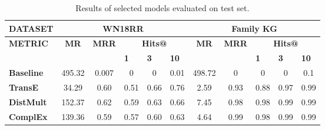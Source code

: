 \begin{table}[h]
\centering
\begin{tabular}{|l||ccccc||ccccc|}
\hline
{\textbf{DATASET}}                 & \multicolumn{5}{c||}{\textbf{WN18RR}}                                                                                                                                               & \multicolumn{5}{c|}{\textbf{Family KG}}                                                                                                                            \\ \hline
\multirow{2}{*}{{\textbf{METRIC}}} & \multicolumn{1}{c|}{\multirow{2}{*}{\textbf{MR}}} & \multicolumn{1}{c|}{\multirow{2}{*}{\textbf{MRR}}} & \multicolumn{3}{c||}{\textbf{Hits@}}                                       & \multicolumn{1}{c|}{\multirow{2}{*}{\textbf{MR}}} & \multicolumn{1}{c|}{\multirow{2}{*}{\textbf{MRR}}} & \multicolumn{3}{c|}{\textbf{Hits@}}                                       \\ \cline{4-6} \cline{9-11} 
                                       & \multicolumn{1}{c|}{}                             & \multicolumn{1}{c|}{}                              & \multicolumn{1}{l|}{\textbf{1}} & \multicolumn{1}{l|}{\textbf{3}} & \multicolumn{1}{l||}{\textbf{10}} & \multicolumn{1}{c|}{}                             & \multicolumn{1}{c|}{}                              & \multicolumn{1}{l|}{\textbf{1}} & \multicolumn{1}{l|}{\textbf{3}} & \multicolumn{1}{l|}{\textbf{10}} \\ \hline
\textbf{Baseline}       & 495.32     & 0.007      & 0     & 0       & 0.01        & 498.72       & 0     & 0       & 0       & 0.1      \\ 
\textbf{TransE}  & 34.29  & 0.60       & 0.51                     & 0.66    & 0.76 & 2.59     & 0.93  &0.88  & 0.97   & 0.99   \\ 
\textbf{DistMult}      & 152.37  & 0.62    & 0.59   & 0.63      & 0.66   & 7.45    & 0.98     & 0.98    & 0.99   & 0.99    \\ 
\textbf{ComplEx}        & 139.36    & 0.59      & 0.57      & 0.60      & 0.63      & 4.64     & 0.99     & 0.98     & 0.99      & 0.99  \\ \hline
\end{tabular}
\caption{Results of selected models evaluated on test set.}
\end{table}


